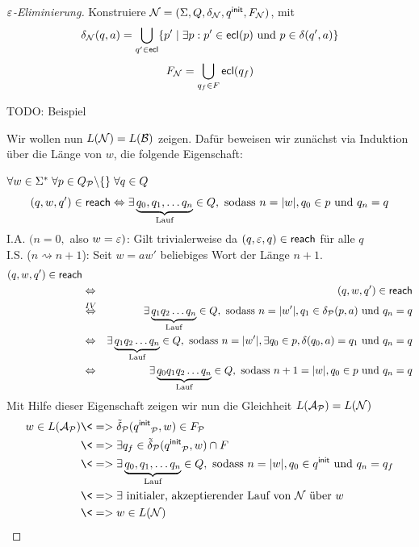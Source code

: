 \begin{proof}[$\varepsilon$-Eliminierung]
        Konstruiere $\mathcal{N}= (\Sigma, Q,\delta_{\mathcal{N}},{q^\mathsf{init}},F_{\mathcal{N}})$, mit
        $$\delta_{\mathcal{N}}(q,a)=\bigcup\limits_{q'\in\textsf{ecl}}\{p'\mid \exists p : p'\in\textsf{ecl}(p) \text{ und } p\in\delta(q',a)\}$$
        $$F_{\mathcal{N}}=\bigcup\limits_{q_f\in F}\textsf{ecl}(q_f)$$
        
        TODO: Beispiel
        
        
        
        Wir wollen nun $L(\mathcal{N})=L(\mathcal{B})$ zeigen. 
        Dafür beweisen wir zunächst via Induktion über die Länge von $w$, die folgende Eigenschaft:
        
        $\forall w\in\Sigma^*\; \forall p\in Q_{\mathcal{P}}\backslash\{\}\; \forall q\in Q$
        $$(q,w,q')\in\textsf{reach} \Leftrightarrow \exists \underbrace{q_0, q_1,\ldots q_n}_{\text{Lauf}}\in Q, \text{ sodass }  n=|w|, q_0\in p \text{ und } q_n=q$$
        I.A. $(n=0,$ also $w=\varepsilon)$: Gilt trivialerweise da $(q,\varepsilon,q)\in\textsf{reach}$ für alle $q$\\
        I.S. ($n\rightsquigarrow n+1$): Seit $w=aw'$ beliebiges Wort der Länge $n+1$.
        \begin{eqnarray*}
                (q,w,q')\in\textsf{reach}\\
                & \Leftrightarrow & (q,w,q')\in\textsf{reach}\\
                & \stackrel{IV}{\Leftrightarrow} & \exists\underbrace{q_1q_2\ldots q_n}_{\text{Lauf}}\in Q, \text{ sodass }  n=|w'|, q_1\in \delta_{\mathcal{P}}(p,a) \text{ und } q_n=q\\
                & \Leftrightarrow & \exists\underbrace{q_1q_2\ldots q_n}_{\text{Lauf}}\in Q, \text{ sodass }  n=|w'|, \exists q_0\in p, \delta(q_0,a)=q_1 \text{ und } q_n=q\\
                & \Leftrightarrow & \exists\underbrace{q_0q_1q_2\ldots q_n}_{\text{Lauf}}\in Q,\text{ sodass }  n+1=|w|, q_0\in p \text{ und } q_n=q
        \end{eqnarray*}
        Mit Hilfe dieser Eigenschaft zeigen wir nun die Gleichheit $L(\mathcal{A}_{\mathcal{P}})=L(\mathcal{N})$
        \begin{align*}
         w\in L(\A_\calP) 
         &\<=> \tilde\delta_\calP(\qinit_\calP,w)\in F_\calP\\
         &\<=> \exists q_f\in \tilde\delta_\calP(\qinit_\calP,w)\cap F\\
         &\<=> \exists \underbrace{q_0, q_1,\ldots q_n}_{\text{Lauf}}\in Q, \text{ sodass }  n=|w|, q_0\in \qinit \text{ und } q_n=q_f\\
         &\<=> \exists \text{ initialer, akzeptierender Lauf von $\calN$ über $w$} \\
         &\<=> w\in L(\calN)
        \end{align*}
\end{proof}




